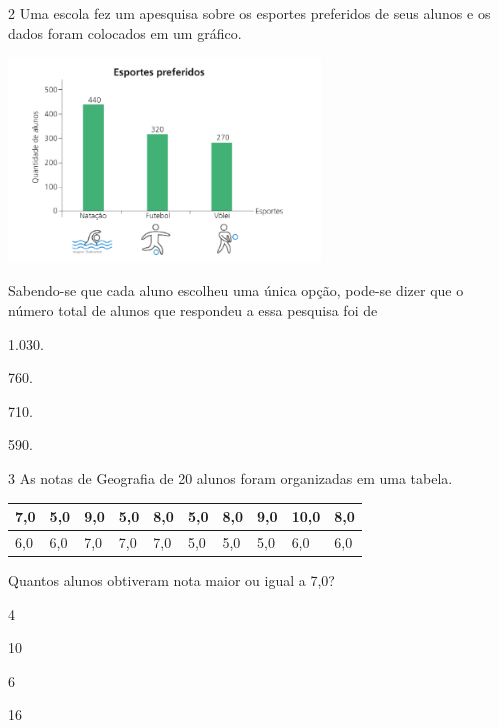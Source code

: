 \num{2} Uma escola fez um apesquisa sobre os esportes preferidos de seus alunos
e os dados foram colocados em um gráfico.


\includegraphics[width=3.25862in,height=2.14185in]{./media/image105.png}

Sabendo-se que cada aluno escolheu uma única opção, pode-se dizer que o
número total de alunos que respondeu a essa pesquisa foi de

\begin{escolha}
\item
  1.030.
\item
  760.
\item
  710.
\item
  590.
\end{escolha}

\num{3} As notas de Geografia de 20 alunos foram organizadas em uma tabela.

\begin{longtable}[]{@{}llllllllll@{}}
\toprule
7,0 & 5,0 & 9,0 & 5,0 & 8,0 & 5,0 & 8,0 & 9,0 & 10,0 &
8,0\tabularnewline
\midrule
\endhead
6,0 & 6,0 & 7,0 & 7,0 & 7,0 & 5,0 & 5,0 & 5,0 & 6,0 & 6,0\tabularnewline
\bottomrule
\end{longtable}

Quantos alunos obtiveram nota maior ou igual a 7,0?

\begin{escolha}
\item
  4
\item
  10
\item
  6
\item
  16
\end{escolha}

